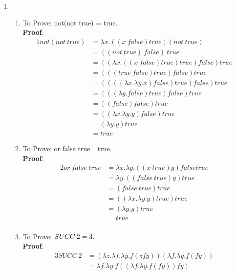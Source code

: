 \documentclass[11pt]{article}
\begin{document}
\begin{enumerate}
\item 
\begin{enumerate}
    \item To Prove: not(not true) = true.\\
          \textbf{Proof}: \begin{alignat*}{1}
                 not(not\:true)
                 &=  \lambda x.((x\:false)true)(not\:true) \\
                 &= ((not\:true)\:false)\:true \\
                &=  ((\lambda x.((x\:false) true) true)false) true \\
                 &= (((true\:false) true) false)true\\
                 &= ((((\lambda x. \lambda y.x) false) true)false) true\\
                &= (((\lambda y.false) true) false)true \\
                &= ((false) false) true \\
                &= ((\lambda x.\lambda y.y) false) true\\
                &= (\lambda y.y) true \\
                &= true 
                \end{alignat*}
    \item To Prove: or false true= true.\\
          \textbf{Proof}:  \begin{alignat*}{2}
                or\:false\:true  &= \lambda x.\lambda y.((x\:true) y) false true \\
                    &= \lambda y.((false\:true) y) true\\
                    &= (false\:true) true\\
                    &= ((\lambda x.\lambda y.y) true) true\\
                    &= (\lambda y.y) true\\
                    &= true\\
            \end{alignat*}
    \item To Prove: $SUCC\:\Bar{2}=\Bar{3}.$\\
          \textbf{Proof}:  \begin{alignat*}{3}
                SUCC\:2  &= (\lambda z. \lambda f. \lambda y. f (z f y))(\lambda f. \lambda y. f (f y))\\
                        &=  \lambda f. \lambda y. f ( (\lambda f. \lambda y. f (f y)) f y)\\

\end{alignat*}
\end{enumerate}
\end{enumerate}
\end{document}
